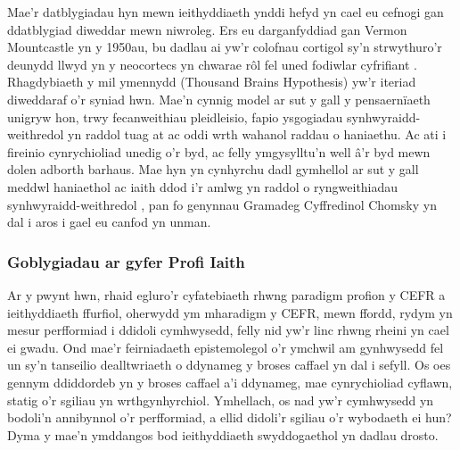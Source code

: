 Mae'r datblygiadau hyn mewn ieithyddiaeth ynddi hefyd yn cael eu cefnogi gan ddatblygiad diweddar mewn niwroleg. Ers eu darganfyddiad gan Vermon Mountcastle yn y 1950au, bu dadlau ai yw'r colofnau cortigol sy'n strwythuro'r deunydd llwyd yn y neocortecs yn chwarae rôl fel uned fodiwlar cyfrifiant \parencite{horton_cortical_2005}. Rhagdybiaeth y mil ymennydd (Thousand Brains Hypothesis) \parencite{hawkins_theory_2017, hawkins_thousand_2021} yw'r iteriad diweddaraf o'r syniad hwn. Mae'n cynnig model ar sut y gall y pensaernïaeth unigryw hon, trwy fecanweithiau pleidleisio, fapio ysgogiadau synhwyraidd-weithredol yn raddol tuag at ac oddi wrth wahanol raddau o haniaethu. Ac ati i fireinio cynrychioliad unedig o'r byd, ac felly ymgysylltu'n well â'r byd mewn dolen adborth barhaus. Mae hyn yn cynhyrchu dadl gymhellol ar sut y gall meddwl haniaethol ac iaith ddod i'r amlwg yn raddol o ryngweithiadau synhwyraidd-weithredol \parencite{constantinescu_organizing_2016}, pan fo genynnau Gramadeg Cyffredinol Chomsky yn dal i aros i gael eu canfod yn unman.

\subsubsection{Goblygiadau ar gyfer Profi Iaith}
Ar y pwynt hwn, rhaid egluro'r cyfatebiaeth rhwng paradigm profion y CEFR a ieithyddiaeth ffurfiol, oherwydd ym mharadigm y CEFR, mewn ffordd, rydym yn mesur perfformiad i ddidoli cymhwysedd, felly nid yw'r linc rhwng rheini yn cael ei gwadu. Ond mae'r feirniadaeth epistemolegol o'r ymchwil am gynhwysedd fel un sy'n tanseilio dealltwriaeth o ddynameg y broses caffael yn dal i sefyll. Os oes gennym ddiddordeb yn y broses caffael a'i ddynameg, mae cynrychioliad cyflawn, statig o'r sgiliau yn wrthgynhyrchiol. Ymhellach, os nad yw'r cymhwysedd yn bodoli'n annibynnol o'r perfformiad, a ellid didoli'r sgiliau o'r wybodaeth ei hun? Dyma y mae'n ymddangos bod ieithyddiaeth swyddogaethol yn dadlau drosto.

